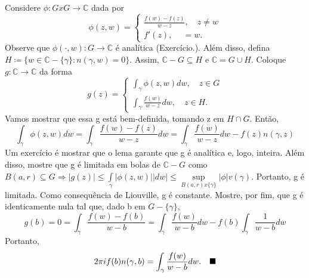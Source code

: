 \documentclass[ComplexAnalysis/complex.tex]{subfiles}
\begin{document}
\begin{proof*}
	Considere $\phi:GxG\rightarrow \mathbb{C}$ dada por
	$$
		\phi(z, w) = \left\{\begin{array}{ll}
			\frac{f(w)-f(z)}{w-z}, \quad z\neq{w} \\
			f'(z), \quad \ = w.
		\end{array}\right.
	$$
	Observe que $\phi(\cdot, w):G\rightarrow \mathbb{C}$ é analítica (Exercício.). Além disso, defina
	$H\coloneqq \{w\in{\mathbb{C}-\{\gamma\}}: n(\gamma, w) = 0\}$. Assim, $\mathbb{C}-G\subseteq{H}\text{ e } \mathbb{C} = G\cup{H}$.
	Coloque $g:\mathbb{C}\rightarrow \mathbb{C}$ da forma
	$$
		g(z) = \left\{\begin{array}{ll}
			\int_{\gamma}^{}\phi(z, w)dw, \quad z\in{G} \\
			\int_{\gamma}^{}\frac{f(w)}{w-z}dw, \quad z\in{H}.
		\end{array}\right.
	$$
	Vamos mostrar que essa g está bem-definida, tomando z em $H\cap{G}.$ Então,
	$$
		\int_{\gamma}^{}\phi(z, w)dw = \int_{\gamma}^{}\frac{f(w)-f(z)}{w-z}dw = \int_{\gamma}^{}\frac{f(w)}{w-z}dw - f(z)n(\gamma, z)
	$$
	Um exercício é mostrar que o lema garante que g é analítica e, logo, inteira. Além disso, mostre que g é limitada em
	bolas de $\mathbb{C}-G$ como $B(a, r)\subseteq{G}\Rightarrow |g(z)|\leq \int\limits_{\gamma}|\phi(z, w)||dw|\leq \sup\limits_{B(a, r)x \{\gamma\} }|\phi|v(\gamma)$.
	Portanto, g é limitada. Como consequência de Liouville, g é constante. Mostre, por fim, que g é identicamente nula tal que, dado b em
	$G-\{\gamma\}$,
	$$
		g(b) = 0 = \int_{\gamma}^{}\frac{f(w) - f(b)}{w-b} = \int_{\gamma}^{}\frac{f(w)}{w-b}dw - f(b) \int_{\gamma}^{}\frac{1}{w-b}dw
	$$
	Portanto,
	$$
		2\pi if(b)n(\gamma, b) = \int_{\gamma}^{}\frac{f(w)}{w-b}dw. \quad\text{$\blacksquare$}
	$$
\end{proof*}
\end{document}
